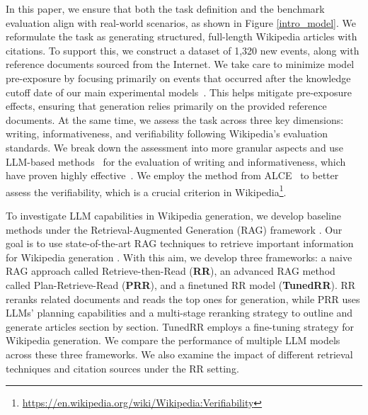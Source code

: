 \documentclass[11pt]{article}
\begin{document}
In this paper, we ensure that both the task definition and the benchmark evaluation align with real-world scenarios, as shown in Figure \ref{intro_model}.
We reformulate the task as generating structured, full-length Wikipedia articles with citations. To support this, we construct a dataset of 1,320 new events, along with 
reference documents sourced from the Internet. We take care to minimize model pre-exposure by focusing primarily on events that occurred after the knowledge cutoff date of our main experimental models~\citep{ouyang2022training, touvron2023llama}. This helps mitigate pre-exposure effects, ensuring that generation relies primarily  on the provided reference documents.
At the same time, we assess the task across three key dimensions: writing, informativeness, and verifiability following Wikipedia's evaluation standards. We break down the assessment into more granular aspects and use LLM-based methods~\citep{achiam2023gpt,kim2024prometheus} for the evaluation of writing and informativeness, which have proven highly effective~\citep{sottana2023evaluation,chiang-lee-2023-large,lin2023llmeval}. We employ the method from ALCE~\citep{gao2023enabling} to better assess the verifiability, which is a crucial criterion in Wikipedia\footnote{\url{https://en.wikipedia.org/wiki/Wikipedia:Verifiability}}.

To investigate LLM capabilities in Wikipedia generation, we develop baseline methods under the Retrieval-Augmented Generation (RAG) framework \citep{lewis2020retrieval, izacard2020leveraging, hu2023survey}. Our goal is to use state-of-the-art RAG techniques to retrieve important information for Wikipedia generation \cite{gao2023retrieval, ma2023query, shao2023enhancing}. With this aim, we develop three frameworks: a naive RAG approach called Retrieve-then-Read (\textbf{RR}), an advanced RAG method called Plan-Retrieve-Read (\textbf{PRR}), and a finetuned RR model (\textbf{TunedRR}). RR reranks related documents and reads the top ones for generation, while PRR uses LLMs' planning capabilities and a multi-stage reranking strategy to outline and generate articles section by section. TunedRR employs a fine-tuning strategy for Wikipedia generation. We compare the performance of multiple LLM models across these three frameworks.
We also examine the impact of different retrieval techniques and citation sources under the RR setting.%
\end{document}
